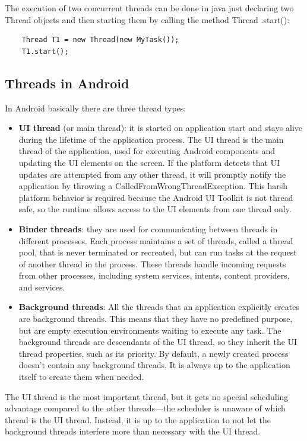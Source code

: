 The execution of two concurrent threads can be done in java just declaring two Thread objects and then starting them by calling the method Thread .start():
\begin{lstlisting}
	Thread T1 = new Thread(new MyTask());
	T1.start();
\end{lstlisting}

\subsection{Threads in Android}
In Android basically there are three thread types:
\begin{itemize}
	\item \textbf{UI thread} (or main thread): it is started on application start and stays alive during the lifetime of the application process. The UI thread is the main thread of the application, used for executing Android components and updating the UI elements on the screen. If the platform detects that UI updates are attempted from any other thread, it will promptly notify the application by throwing a CalledFromWrongThreadException. This harsh platform behavior is required because the Android UI Toolkit is not thread safe, so the runtime allows access to the UI elements from one thread only.
	\item \textbf{Binder threads}: they are used for communicating between threads in different processes. Each process maintains a set of threads, called a thread pool, that is never terminated or recreated, but can run tasks at the request of another thread in the process. These threads handle incoming requests from other processes, including system services, intents, content providers, and services.
	\item \textbf{Background threads}: All the threads that an application explicitly creates are background threads. This means that they have no predefined purpose, but are empty execution environments waiting to execute any task. The background threads are descendants of the UI thread, so they inherit the UI thread properties, such as its priority. By default, a newly created process doesn’t contain any background threads. It is always up to the application itself to create them when needed.
\end{itemize}
The UI thread is the most important thread, but it gets no special scheduling advantage compared to the other threads—the scheduler is unaware of which thread is the UI thread. Instead, it is up to the application to not let the background threads interfere more than necessary with the UI thread.

